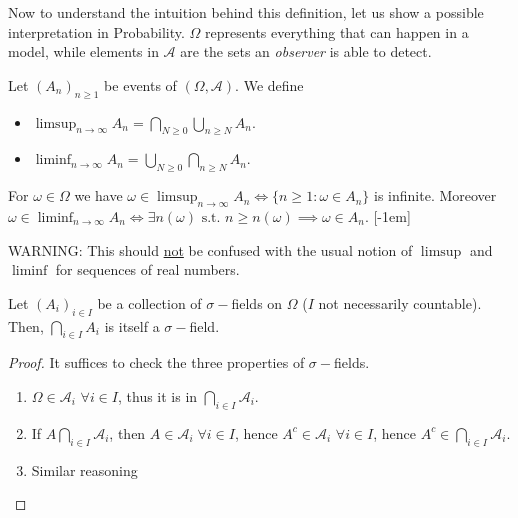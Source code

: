 \documentclass{scrartcl}
\begin{document}
  Now to understand the intuition behind this definition, let us show a possible interpretation
  in Probability. $\Omega$ represents everything that can happen in a model, while elements in
  $\mathcal{A}$ are the sets an \textit{observer} is able to detect.

  \begin{definition}
    Let  $(A_n)_{n \geq 1}$ be events of $(\Omega, \mathcal{A})$. We define
    \begin{itemize}
      \item $\limsup_{n \to \infty} A_n = \bigcap_{N\geq 0}\bigcup_{n \geq N} A_n$.
      \item $\liminf_{n \to \infty} A_n = \bigcup_{N\geq 0}\bigcap_{n \geq N} A_n$.
    \end{itemize}
  \end{definition}
  \begin{remark}
    For $\omega \in \Omega$ we have $\omega \in \limsup_{n \to \infty} A_n \iff \{ n \geq 1
    \colon \omega \in A_n \} $ is infinite. Moreover $\omega \in \liminf_{n \to \infty}A_n \iff
    \exists n(\omega) \text{ s.t. } n \geq n(\omega) \implies \omega \in A_n$.
    [-1em]
  \end{remark}
  
  {\color{red} WARNING:} This should \underline{not} be confused with the usual notion of
  $\limsup$ and $\liminf$ for sequences of real numbers.

  \begin{proposition}
    Let $(A_i)_{i \in I}$ be a collection of $\sigma-$fields on $\Omega$ ($I$ not necessarily
    countable). Then, $\bigcap_{i \in I} A_i$ is itself a $\sigma-$field.
  \end{proposition}
  \begin{proof}
      It suffices to check the three properties of $\sigma-$fields.
      \begin{enumerate}
        \item $\Omega \in \mathcal{A}_i$ $\forall i \in I$, thus it is in $\bigcap_{i \in I}
          \mathcal{A}_i$.

        \item If $A \bigcap_{i \in I} \mathcal{A}_i$, then $A \in \mathcal{A}_i \;\forall i \in
          I$, hence $A^c \in \mathcal{A}_i$ $\forall i \in I$, hence $A^c \in \bigcap_{i \in I}
          \mathcal{A}_i$.

        \item Similar reasoning 
      \end{enumerate}
  \end{proof}
\end{document}
